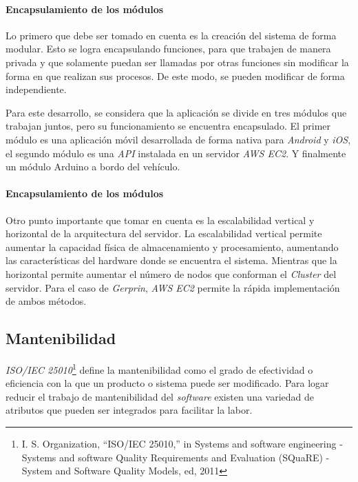 \paragraph{Encapsulamiento de los módulos\\}

Lo primero que debe ser tomado en cuenta es la creación del sistema de forma modular. Esto se logra encapsulando funciones, para que trabajen de manera privada y que solamente puedan ser llamadas por otras funciones sin modificar la forma en que realizan sus procesos. De este modo, se pueden modificar de forma independiente. 

Para este desarrollo, se considera que la aplicación se divide en tres módulos que trabajan juntos, pero su funcionamiento se encuentra encapsulado. El primer módulo es una aplicación móvil desarrollada de forma nativa para \textit{Android} y \textit{iOS}, el segundo módulo es una \textit{API} instalada en un servidor \textit{AWS EC2}. Y finalmente un módulo Arduino a bordo del vehículo. 

\paragraph{Encapsulamiento de los módulos\\}

Otro punto importante que tomar en cuenta es la escalabilidad vertical y horizontal de la arquitectura del servidor. La escalabilidad vertical permite aumentar la capacidad física de almacenamiento y procesamiento, aumentando las características del hardware donde se encuentra el sistema. Mientras que la horizontal permite aumentar el número de nodos que conforman el \textit{Cluster} del servidor. Para el caso de \textit{Gerprin}, \textit{AWS EC2} permite la rápida implementación de ambos métodos.

\subsection{Mantenibilidad}

\textit{ISO/IEC 25010}\footnote{I. S. Organization, “ISO/IEC 25010,” in Systems and software engineering - Systems and software Quality Requirements and Evaluation (SQuaRE) - System and Software Quality Models, ed, 2011} define la mantenibilidad como el grado de efectividad o eficiencia con la que un producto o sistema puede ser modificado. Para logar reducir el trabajo de mantenibilidad del \textit{software} existen una variedad de atributos que pueden ser integrados para facilitar la labor. 

